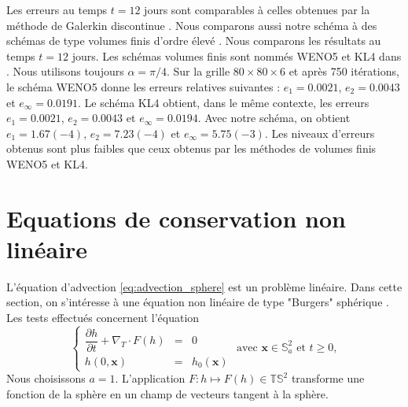 Les erreurs au temps $t=12$ jours sont comparables à celles obtenues par la méthode de Galerkin discontinue \cite{Nair2008}. Nous comparons aussi notre schéma à des schémas de type volumes finis d'ordre élevé \cite{Katta2015}. Nous comparons les résultats au temps $t=12$ jours. Les schémas volumes finis sont nommés WENO5 et KL4 dans \cite{Katta2015}. Nous utilisons toujours $\alpha = \pi/4$. Sur la grille $80 \times 80 \times 6$ et après 750 itérations, le schéma WENO5 donne les erreurs relatives suivantes : $e_1 = 0.0021$, $e_2 = 0.0043$ et $e_{\infty} = 0.0191$. Le schéma KL4 obtient, dans le même contexte, les erreurs $e_1 = 0.0021$, $e_2 = 0.0043$ et $e_{\infty} = 0.0194$. Avec notre schéma, on obtient $e_1 = 1.67(-4)$, $e_2=7.23(-4)$ et $e_{\infty} = 5.75(-3)$. Les niveaux d'erreurs obtenus sont plus faibles que ceux obtenus par les méthodes de volumes finis WENO5 et KL4.


























\section{Equations de conservation non linéaire}

L'équation d'advection \eqref{eq:advection_sphere} est un problème linéaire. Dans cette section, on s'intéresse à une équation non linéaire de type "Burgers" sphérique \cite{BenArtzi2009}. Les tests effectués concernent l'équation
\begin{equation}
\left\lbrace
\begin{array}{rcl}
\dfrac{\partial h}{\partial t} + \nabla_T \cdot F(h) & = & 0 \\
h(0,\mathbf{x}) & = & h_0(\mathbf{x})
\end{array}
\right. \text{ avec } \mathbf{x} \in \mathbb{S}^2_a \text{ et } t \geq 0,
\label{eq:advection_sphere_NL}
\end{equation}
Nous choisissons $a = 1$. L'application $F : h \mapsto F(h) \in \mathbb{T}\mathbb{S}^2$ transforme une fonction de la sphère en un champ de vecteurs tangent à la sphère.

